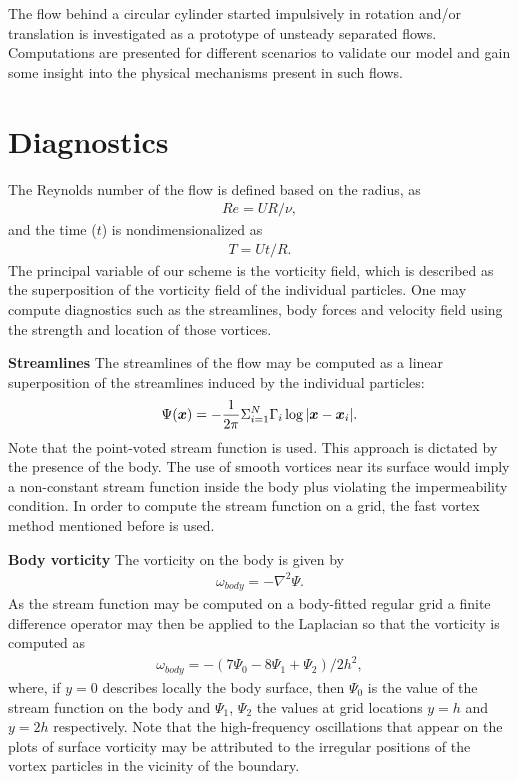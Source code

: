 
The flow behind a circular cylinder started impulsively in rotation and/or translation is investigated as a prototype of unsteady separated flows.
Computations are presented for different scenarios to validate our model and gain some insight into the physical mechanisms present in such flows.

\section{Diagnostics}

The Reynolds number of the flow is defined based on the radius, as
\begin{align}
Re = UR/\nu,
\end{align}
and the time ($t$) is nondimensionalized as
\begin{align}
T = Ut/R.
\end{align}
The principal variable of our scheme is the vorticity field, which is described as the superposition of the vorticity field of the individual particles.
One may compute diagnostics such as the streamlines, body forces and velocity field using the strength and location of those vortices.

{\bf Streamlines}
The streamlines of the flow may be computed as a linear superposition of the streamlines induced by the individual particles:
\begin{align}
\Psi (\boldsymbol{x}) = -\frac{1}{2\pi} \Sigma_{i=1}^{N} \Gamma_i \log |\boldsymbol{x} - \boldsymbol{x}_i|.
\end{align}
Note that the point-voted stream function is used. This approach is dictated by the presence of the body.
The use of smooth vortices near its surface would imply a non-constant stream function inside the body plus violating the impermeability condition.
In order to compute the stream function on a grid, the fast vortex method mentioned before is used.

{\bf Body vorticity}
The vorticity on the body is given by
\begin{align}
\omega_{body} = -\nabla^2 \Psi.
\end{align}
As the stream function may be computed on a body-fitted regular grid a finite difference operator may then be applied to the Laplacian so that the vorticity is computed as
\begin{align}
\omega_{body} = - (7\Psi_0 - 8\Psi_1 + \Psi_2) / 2h^2,
\end{align}
where, if $y = 0$ describes locally the body surface, then $\Psi_0$ is the value of the stream function on the body and $\Psi_1$, $\Psi_2$ the values at grid locations $y = h$ and $y = 2h$ respectively.
Note that the high-frequency oscillations that appear on the plots of surface vorticity may be attributed to the irregular positions of the vortex particles in the vicinity of the boundary.

